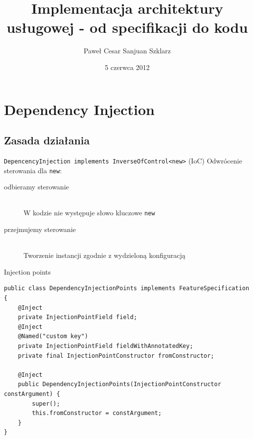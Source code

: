 \documentclass[smaller]{beamer}
\title[Implementacja architektury usługowej]{Implementacja architektury usługowej - od specifikacji do kodu}
\author{Paweł Cesar Sanjuan Szklarz}
\institute{Warszawa Java User Group}
\date{5 czerwca 2012}
\begin{document}
\begin{frame}
\titlepage
\end{frame}


\begin{frame}
 \tableofcontents
\end{frame}

\section{Dependency Injection}
\subsection{Zasada działania}

\begin{frame}{\lstinline|DepencencyInjection implements InverseOfControl<new>|}
(IoC) Odwrócenie sterowania dla \lstinline|new|:
\begin{description}
 \item[odbieramy sterowanie] \hfill \\
 W kodzie nie występuje słowo kluczowe \lstinline|new|
 \item[przejmujemy sterowanie] \hfill \\
 Tworzenie instancji zgodnie z wydzieloną konfiguracją 
\end{description}
\end{frame}

\begin{frame}[fragile]{Injection points}
\begin{lstlisting}
public class DependencyInjectionPoints implements FeatureSpecification {
	@Inject
	private InjectionPointField field;
	@Inject
	@Named("custom key")
	private InjectionPointField fieldWithAnnotatedKey;
	private final InjectionPointConstructor fromConstructor;

	@Inject
	public DependencyInjectionPoints(InjectionPointConstructor constArgument) {
		super();
		this.fromConstructor = constArgument;
	}
}

\end{lstlisting}
% 
\end{frame}
\end{document}

